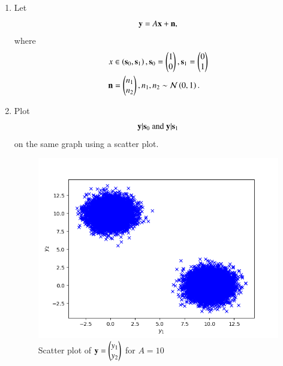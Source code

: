 \begin{enumerate}[label=\thesection.\arabic*.,ref=\thesection.\theenumi]
\item Let 
\begin{equation}
\mathbf{y} = A\mathbf{x} + \mathbf{n},
\end{equation}
where 
\begin{align}
x &\in \left(\mathbf{s}_0,\mathbf{s}_1\right), 
\mathbf{s}_0 = 
\begin{pmatrix}
1 
\\
0
\end{pmatrix},
\mathbf{s}_1 = 
\begin{pmatrix}
0 
\\
1
\end{pmatrix}
\\
\mathbf{n} &= 
\begin{pmatrix}
n_1
\\
n_2
\end{pmatrix},
n_1,n_2 \sim \mathcal{N}\left(0,1\right).
\end{align}
%
\item
\label{ch5_fsk}
Plot 
%
\begin{equation}
\mathbf{y}|\mathbf{s}_0 \text{ and } \mathbf{y}|\mathbf{s}_1
\end{equation}
%
on the same graph using a scatter plot.
\\
\solution 
\begin{figure}
\centering
\includegraphics[width=\columnwidth]{./figs/twoD/scatter_plot.png}
\caption{Scatter plot of $\mathbf{y} = \begin{pmatrix} y_1 \\ y_2 \end{pmatrix}$ for $A = 10$}

\end{figure}
\end{enumerate}

